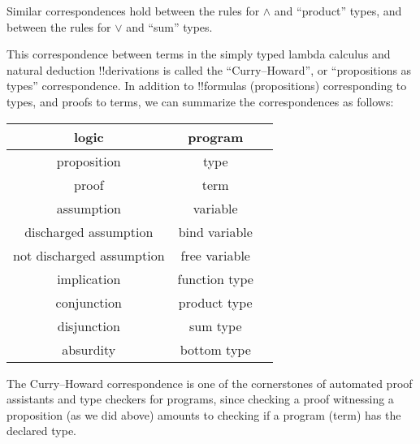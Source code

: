 \documentclass[../../../include/open-logic-section]{subfiles}
\begin{document}
Similar correspondences hold between the rules for $\land$ and ``product''
types, and between the rules for $\lor$ and ``sum'' types.

This correspondence between terms in the simply typed lambda calculus
and natural deduction !!{derivation}s is called the ``Curry--Howard'',
or ``propositions as types'' correspondence.  In addition to
!!{formula}s (propositions) corresponding to types, and proofs to
terms, we can summarize the correspondences as follows:
\begin{center}
  \begin{tabular}{c c c}
    logic & program \\
    \hline
    proposition & type \\
    proof & term \\
    assumption & variable \\
    discharged assumption & bind variable \\
    not discharged assumption & free variable \\
    implication & function type \\
    conjunction & product type \\
    disjunction & sum type \\
    absurdity & bottom type \\
    \hline
  \end{tabular}
\end{center}

The Curry--Howard correspondence is one of the cornerstones of
automated proof assistants and type checkers for programs, since
checking a proof witnessing a proposition (as we did above) amounts to
checking if a program (term) has the declared type.
\end{document}
